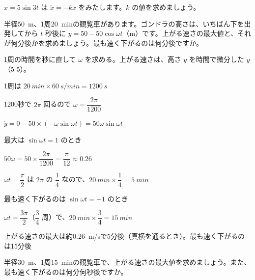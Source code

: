 \begin{jibun}
$x=5\sin3t$ は $\ddot{x}=-kx$ をみたします。$k$ の値を求めましょう。
\end{jibun}

\begin{reidai}[観覧車の高さの変わる速さ]
半径\qty{50}{m}、1周\qty{20}{min}の観覧車があります。ゴンドラの高さは、いちばん下を出発してから $t$ 秒後に $y=50-50\cos\omega t$（m）です。上がる速さの最大値と、それが何分後かを求めましょう。最も速く下がるのは何分後ですか。\par
\kangaekata 1周の時間を秒に直して $\omega$ を求める。上がる速さは、高さ $y$ を時間で微分した $\dot{y}$（5-5）。\par
\shiki 1周は $\qty{20}{min}\times\qty{60}{s/min}=\qty{1200}{s}$\par
\hspace*{2.6\zw}1200秒で $2\pi$ 回るので $\omega=\dfrac{2\pi}{1200}$\par
\hspace*{2.6\zw}$\dot{y}=0-50\times(-\omega\sin\omega t)=50\omega\sin\omega t$\par
\hspace*{2.6\zw}最大は $\sin\omega t=1$ のとき\par
\hspace*{4.6\zw}$50\omega=50\times\dfrac{2\pi}{1200}=\dfrac{\pi}{12}\approx0.26$\par
\hspace*{2.6\zw}$\omega t=\dfrac{\pi}{2}$ は $2\pi$ の $\dfrac{1}{4}$ なので、$\qty{20}{min}\times\dfrac{1}{4}=\qty{5}{min}$\par
\hspace*{2.6\zw}最も速く下がるのは $\sin\omega t=-1$ のとき\par
\hspace*{4.6\zw}$\omega t=\dfrac{3\pi}{2}$（$\dfrac{3}{4}$ 周）で、$\qty{20}{min}\times\dfrac{3}{4}=\qty{15}{min}$\par
\kotae 上がる速さの最大は約\qty{0.26}{m/s}で5分後（真横を通るとき）。最も速く下がるのは15分後
\end{reidai}

\begin{jibun}
半径\qty{30}{m}、1周\qty{15}{min}の観覧車で、上がる速さの最大値を求めましょう。また、最も速く下がるのは何分何秒後ですか。
\end{jibun}

